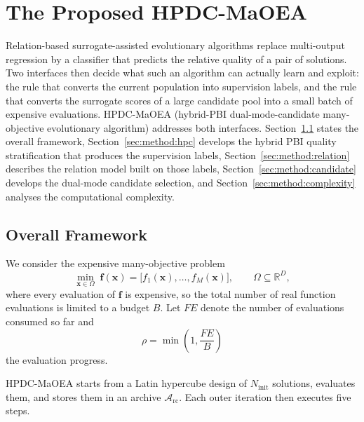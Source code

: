 \documentclass[11pt,a4paper]{article}
\newcommand{\vf}{\mathbf{f}}
\newcommand{\vx}{\mathbf{x}}
\begin{document}
\section{The Proposed HPDC-MaOEA}
\label{sec:method}

Relation-based surrogate-assisted evolutionary algorithms replace multi-output
regression by a classifier that predicts the relative quality of a pair of
solutions. Two interfaces then decide what such an algorithm can actually
learn and exploit: the rule that converts the current population into
supervision labels, and the rule that converts the surrogate scores of a large
candidate pool into a small batch of expensive evaluations. HPDC-MaOEA
(hybrid-PBI dual-mode-candidate many-objective evolutionary algorithm)
addresses both interfaces. Section~\ref{sec:method:framework} states the
overall framework, Section~\ref{sec:method:hpc} develops the hybrid PBI quality
stratification that produces the supervision labels,
Section~\ref{sec:method:relation} describes the relation model built on those
labels, Section~\ref{sec:method:candidate} develops the dual-mode candidate
selection, and Section~\ref{sec:method:complexity} analyses the computational
complexity.

\subsection{Overall Framework}
\label{sec:method:framework}

We consider the expensive many-objective problem
\begin{equation}
\min_{\vx\in\Omega}\;
\vf(\vx)=\bigl[f_1(\vx),\ldots,f_M(\vx)\bigr],
\qquad
\Omega\subseteq\mathbb{R}^{D},
\label{eq:problem}
\end{equation}
where every evaluation of $\vf$ is expensive, so the total number of real
function evaluations is limited to a budget $B$. Let $FE$ denote the number of
evaluations consumed so far and
\begin{equation}
\rho=\min\!\left(1,\frac{FE}{B}\right)
\label{eq:rho}
\end{equation}
the evaluation progress.

HPDC-MaOEA starts from a Latin hypercube design of
$N_{\mathrm{init}}$ solutions, evaluates them, and stores them in an archive
$\mathcal{A}_{\mathrm{rc}}$. Each outer iteration then executes five steps.
\end{document}

